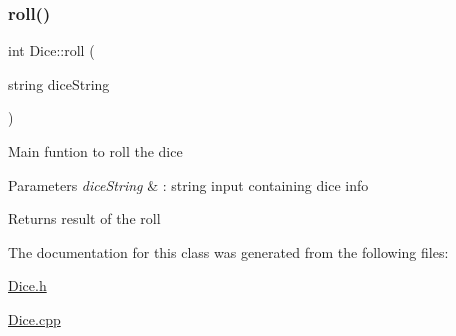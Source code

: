 \subsubsection{\texorpdfstring{roll()}{roll()}}
{\footnotesize\ttfamily int Dice\+::roll (\begin{DoxyParamCaption}\item[{string}]{dice\+String }\end{DoxyParamCaption})\hspace{0.3cm}{\ttfamily [static]}}

Main funtion to roll the dice 
\begin{DoxyParams}{Parameters}
{\em dice\+String} & \+: string input containing dice info \\
\hline
\end{DoxyParams}
\begin{DoxyReturn}{Returns}
result of the roll 
\end{DoxyReturn}


The documentation for this class was generated from the following files\+:\begin{DoxyCompactItemize}
\item 
\hyperlink{_dice_8h}{Dice.\+h}\item 
\hyperlink{_dice_8cpp}{Dice.\+cpp}\end{DoxyCompactItemize}
